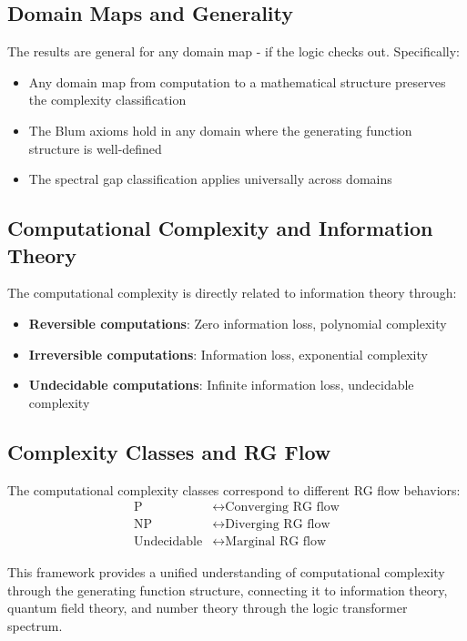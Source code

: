 \subsection{Domain Maps and Generality}

\begin{theorem}
\label{thm:domain-generality}
The results are general for any domain map - if the logic checks out. Specifically:
\begin{itemize}
\item Any domain map from computation to a mathematical structure preserves the complexity classification
\item The Blum axioms hold in any domain where the generating function structure is well-defined
\item The spectral gap classification applies universally across domains
\end{itemize}
\end{theorem}

\subsection{Computational Complexity and Information Theory}

\begin{definition}
\label{def:complexity-information}
The computational complexity is directly related to information theory through:
\begin{itemize}
\item \textbf{Reversible computations}: Zero information loss, polynomial complexity
\item \textbf{Irreversible computations}: Information loss, exponential complexity
\item \textbf{Undecidable computations}: Infinite information loss, undecidable complexity
\end{itemize}
\end{definition}

\subsection{Complexity Classes and RG Flow}

\begin{theorem}
\label{thm:complexity-rg}
The computational complexity classes correspond to different RG flow behaviors:
\begin{align}
\text{P} &\leftrightarrow \text{Converging RG flow} \\
\text{NP} &\leftrightarrow \text{Diverging RG flow} \\
\text{Undecidable} &\leftrightarrow \text{Marginal RG flow}
\end{align}
\end{theorem}

This framework provides a unified understanding of computational complexity through the generating function structure, connecting it to information theory, quantum field theory, and number theory through the logic transformer spectrum.
